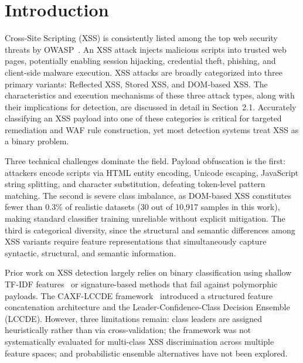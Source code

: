\documentclass[11pt,a4paper]{article}
\begin{document}
\section{Introduction}
\label{sec:intro}

Cross-Site Scripting (XSS) is consistently listed among the top web security
threats by OWASP~\cite{owasp2021}. An XSS attack injects malicious scripts into
trusted web pages, potentially enabling session hijacking, credential theft,
phishing, and client-side malware execution. XSS attacks are broadly
categorized into three primary variants: Reflected XSS, Stored XSS, and
DOM-based XSS. The characteristics and execution mechanisms of these three
attack types, along with their implications for detection, are discussed in
detail in Section~2.1. Accurately classifying an XSS payload into one of
these categories is critical for targeted remediation and WAF rule construction, yet most detection
systems treat XSS as a binary problem.

Three technical challenges dominate the field. Payload obfuscation is the first: attackers encode
scripts via HTML entity encoding, Unicode escaping, JavaScript string splitting, and character
substitution, defeating token-level pattern matching. The second is severe class imbalance, as
DOM-based XSS constitutes fewer than 0.3\% of realistic datasets (30 out of 10,917 samples in this
work), making standard classifier training unreliable without explicit mitigation. The third is
categorical diversity, since the structural and semantic differences among XSS variants require feature
representations that simultaneously capture syntactic, structural, and semantic information.

Prior work on XSS detection largely relies on binary classification using shallow TF-IDF
features~\cite{hua2025caxf} or signature-based methods that fail against polymorphic payloads.
The CAXF-LCCDE framework~\cite{hua2025caxf} introduced a structured feature concatenation
architecture and the Leader-Confidence-Class Decision Ensemble (LCCDE). However, three limitations
remain: class leaders are assigned heuristically rather than via cross-validation; the framework was
not systematically evaluated for multi-class XSS discrimination across multiple feature spaces; and
probabilistic ensemble alternatives have not been explored.
\end{document}
